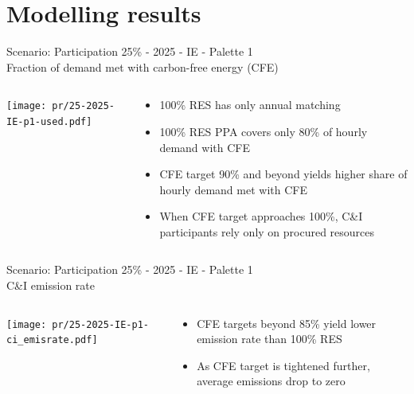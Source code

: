 \section{Modelling results}

\begin{frame}{Scenario: Participation 25\% - 2025 - IE - Palette 1 
\\ Fraction of demand met with carbon-free energy (CFE)}

\begin{columns}[T]
\begin{column}{9cm}
\centering

\texttt{[image: pr/25-2025-IE-p1-used.pdf]}
\end{column}
\begin{column}{5cm}

  \begin{itemize}
  \item 100\% RES has only \alert{annual matching}
  \item 100\% RES PPA covers \alert{only 80\%} of hourly demand with CFE
  \item CFE target \alert{90\%} and beyond yields higher share of hourly demand met with CFE
  \item When CFE target approaches 100\%, C\&I participants rely \alert{only on procured resources}
  \end{itemize}
  
\end{column}
\end{columns}

\end{frame}



\begin{frame}{Scenario: Participation 25\% - 2025 - IE - Palette 1
\\ C\&I emission rate}

\begin{columns}[T]
\begin{column}{9cm}
\centering

\texttt{[image: pr/25-2025-IE-p1-ci\_emisrate.pdf]}
\end{column}
\begin{column}{5cm}

  \vspace{.5cm}

  \begin{itemize}
  \item CFE targets beyond \alert{85\%} yield lower emission rate than 100\% RES 
  \item As CFE target is tightened further, average emissions \alert{drop to zero}
  \end{itemize}
\end{column}
\end{columns}

\end{frame}



